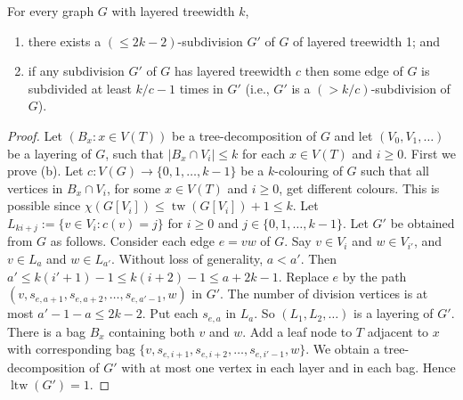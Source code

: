\documentclass[kpfonts]{patmorin}
\DeclareMathOperator{\tw}{tw}
\DeclareMathOperator{\ltw}{ltw}
\begin{document}
\begin{thm}
\label{LayeredTreewidthSubdivision}
For every graph $G$ with layered treewidth $k$,
\begin{enumerate}[label=(\alph*),font=\upshape]
\item there exists a $(\le\!\!2k-2)$-subdivision $G'$ of $G$ of layered
treewidth 1; and
\item if any subdivision $G'$ of $G$ has layered treewidth $c$ then some edge of $G$ is subdivided at least $k/c-1$ times in $G'$ (i.e., $G'$ is a $(>\!\!k/c)$-subdivision of $G$).
\end{enumerate}
\end{thm}

\begin{proof}
Let $(B_x:x\in V(T))$ be a tree-decomposition of $G$ and let
$(V_0,V_1,\dots)$ be a layering of $G$, such that $|B_x\cap V_i|\leq
k$ for each $x\in V(T)$ and $i\geq 0$.
First we prove (b). Let $c:V(G)\to\{0,1,\dots,k-1\}$ be a
$k$-colouring of $G$ such that all vertices in $B_x\cap V_i$, for some
$x\in V(T)$ and $i\geq 0$, get different colours. This is possible
since $\chi(G[V_i]) \leq \tw( G[V_i] )+1 \leq k$. Let $L_{ki+j} := \{v
\in V_i : c(v)=j\}$ for $i\geq 0$ and $j\in\{0,1,\dots,k-1\}$. Let
$G'$ be obtained from $G$ as follows. Consider each edge $e = vw$ of
$G$. Say $v\in V_i$ and $w\in V_{i'}$, and $v\in L_a$ and $w\in
L_{a'}$. Without loss of generality, $a<a'$. Then $a' \leq k(i'+1) - 1
\leq k(i+2)-1 \leq a + 2k-1$.
Replace $e$ by the path $(v, s_{e,a+1}, s_{e,a+2}, \dots, s_{e,a'-1},
w)$ in $G'$.
The number of division vertices is at most $a'-1-a \leq 2k-2$.
Put each $s_{e,a}$ in $L_a$. So $(L_1,L_2,\dots)$ is a layering of $G'$.
There is a bag $B_x$ containing both $v$ and $w$.
Add a leaf node to $T$ adjacent to $x$ with corresponding bag
$\{v, s_{e,i+1}, s_{e,i+2}, \dots, s_{e,i'-1}, w\}$.
We obtain a tree-decomposition of $G'$ with at most one vertex in each
layer and in each bag. Hence $\ltw(G')=1$.



\end{proof}
\end{document}
